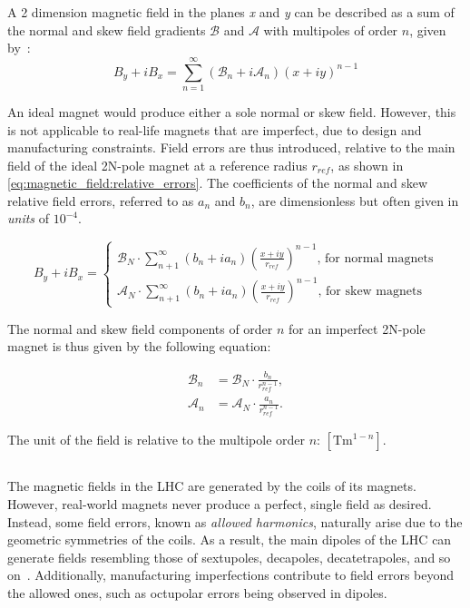 A 2 dimension magnetic field in the planes \textit{x} and \textit{y} can be described as a sum of
the normal and skew field gradients $\mathcal{B}$ and $\mathcal{A}$ with multipoles of order $n$,
given by~\cite{wolf_engineering_2001}:
\begin{equation}
    B_y + iB_x = \sum_{n=1}^\infty \left(\mathcal{B}_n + i\mathcal{A}_n \right)  (x+iy)^{n-1}
\end{equation}


An ideal magnet would produce either a sole normal or skew field. However, this is not applicable 
to real-life magnets that are imperfect, due to design and manufacturing constraints.
Field errors are thus introduced, relative to the main field of the ideal 2N-pole magnet at a
reference radius $r_{ref}$, as shown in \cref{eq:magnetic_field:relative_errors}. The
coefficients of the normal and skew relative field errors, referred to as $a_n$ and $b_n$, are
dimensionless but often given in \textit{units} of $10^{-4}$.

\begin{equation}
    B_y + iB_x = 
        \begin{cases}
            \mathcal{B}_N \cdot \sum_{n+1}^\infty (b_n + ia_n) \left(\frac{x+iy}{r_{ref}}\right)^{n-1}\text{, for normal magnets}\\
            \mathcal{A}_N \cdot \sum_{n+1}^\infty (b_n + ia_n) \left(\frac{x+iy}{r_{ref}}\right)^{n-1}\text{, for skew magnets}
        \end{cases}
    \label{eq:magnetic_field:relative_errors}
\end{equation}


The normal and skew field components of order $n$ for an imperfect 2N-pole magnet is thus given by
the following equation:

\begin{equation}
    \begin{aligned}
        \mathcal{B}_n &= \mathcal{B}_N \cdot \frac{b_n}{r_{ref}^{n-1}}, \\
        \mathcal{A}_n &= \mathcal{A}_N \cdot \frac{a_n}{r_{ref}^{n-1}}.
    \end{aligned}
\end{equation}

The unit of the field is relative to the multipole order $n$: $[\text{Tm}^{1-n}]$.


\subsection{}
The magnetic fields in the LHC are generated by the coils of its magnets. However, real-world
magnets never produce a perfect, single field as desired. Instead, some field errors, known as
\textit{allowed harmonics}, naturally arise due to the geometric symmetries of the coils. As a
result, the main dipoles of the LHC can generate fields resembling those of sextupoles, decapoles,
decatetrapoles, and so on~\cite{deniau_magnetic_2009}. Additionally, manufacturing imperfections
contribute to field errors beyond the allowed ones, such as octupolar errors being observed in
dipoles.

